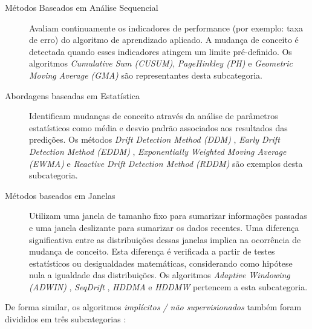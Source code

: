 \documentclass[qual, classic, a4paper]{ufbathesis}
\begin{document}
\begin{description}
    \item[Métodos Baseados em Análise Sequencial] Avaliam continuamente os indicadores de performance (por exemplo: taxa de erro) do algoritmo de aprendizado aplicado.
    A mudança de conceito é detectada quando esses indicadores atingem um limite pré-definido.
    Os algoritmos \textit{Cumulative Sum (CUSUM)}, \textit{PageHinkley (PH)} \cite{Page:CUSUM:PageHinkley:1954} e \textit{Geometric Moving Average (GMA)} \cite{Roberts:2000:CCT:338441.338464}
    são representantes desta subcategoria.

    \item[Abordagens baseadas em Estatística] Identificam mudanças de conceito através da análise de parâmetros estatísticos como média e desvio padrão associados aos resultados das predições.
    Os métodos \textit{Drift Detection Method (DDM)} \cite{GamaMCR04}, 
    \textit{Early Drift Detection Method (EDDM)} \cite{EDDM}, 
    \textit{Exponentially Weighted Moving Average (EWMA)} \cite{Ross:2012:EWM:2076039.2076307} e 
    \textit{Reactive Drift Detection Method (RDDM)} \cite{Barros:RDDM:2017} são exemplos desta subcategoria.

    \item[Métodos baseados em Janelas] Utilizam uma janela de tamanho fixo para sumarizar informações passadas e uma janela deslizante para sumarizar os dados recentes.
    Uma diferença significativa entre as distribuições dessas janelas implica na ocorrência de mudança de conceito.
    Esta diferença é verificada a partir de testes estatísticos ou desigualdades matemáticas, considerando como hipótese nula a igualdade das distribuições.
    Os algoritmos 
    \textit{Adaptive Windowing (ADWIN)} \cite{BifetG07}, 
    \textit{SeqDrift} \cite{PearsSK14:SeqDrift:2014}, 
    \textit{HDDMA} e \textit{HDDMW} \cite{BlancoCRBDM15:HDDMA:HDDMW:2015}
    pertencem a esta subcategoria.
\end{description}

De forma similar, os algoritmos \textit{implícitos / não supervisionados} também foram divididos em três subcategorias \cite{GONCALVES20148144}:
\end{document}
